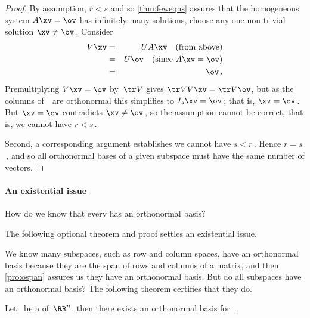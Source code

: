 \begin{proof}
By assumption, \(r<s\) and so \cref{thm:feweqns} assures that the homogeneous system \(A\xv=\ov\) has infinitely many solutions, choose any one non-trivial solution \(\xv\neq\ov\)\,.
Consider 
\begin{eqnarray*}
V\xv&=& UA\xv\quad(\text{from above})
\\&=&U\ov\quad(\text{since }A\xv=\ov)
\\&=&\ov\,.
\end{eqnarray*}
Premultiplying \(V\xv=\ov\) by~\(\tr V\) gives \(\tr VV\xv=\tr V\ov\), but as the columns of~\cV\ are orthonormal this simplifies to \(I_s\xv=\ov\)\,; that is, \(\xv=\ov\)\,.  
But \(\xv=\ov\) contradicts \(\xv\neq\ov\)\,, so the assumption cannot be correct, that is, we cannot have \(r<s\)\,.

Second, a corresponding argument establishes we cannot have \(s<r\)\,.
Hence \(r=s\)\,, and so all orthonormal bases of a given subspace must have the same number of vectors.
\end{proof}







\begin{comment}
Some books do not appear to establish that every subspace is a span of something.  The following argument is similar to Gramm--Schmidt, but not identical.  
\end{comment}

\paragraph{An existential issue} 
How do we know that every  has an orthonormal basis? 
\begin{aside}
The following optional theorem and proof settles an existential issue.
\end{aside}%
We know many subspaces, such as row and column spaces, have an orthonormal basis because they are the span of rows and columns of a matrix, and then \cref{pro:ospan} assures us they have an orthonormal basis.
But do all subspaces have an orthonormal basis?  
The following theorem certifies that they do.



\begin{theorem} \label{thm:obaseexists}
Let \WW\ be a  of~\(\RR^n\), then there exists an orthonormal basis for~\WW.
\end{theorem}

